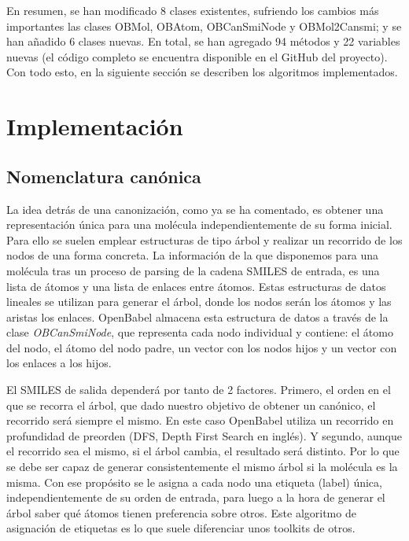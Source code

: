 En resumen, se han modificado 8 clases existentes, sufriendo los cambios más importantes las clases OBMol, OBAtom, OBCanSmiNode y OBMol2Cansmi; y se han añadido 6 clases nuevas. En total, se han agregado 94 métodos y 22 variables nuevas (el código completo se encuentra disponible en el GitHub del proyecto). Con todo esto, en la siguiente sección se describen los algoritmos implementados.

\section{Implementación}

\subsection{Nomenclatura canónica} \label{canonizacion} \label{implementacion:canonizado}

La idea detrás de una canonización, como ya se ha comentado, es obtener una representación única para una molécula independientemente de su forma inicial. Para ello se suelen emplear estructuras de tipo árbol y realizar un recorrido de los nodos de una forma concreta. La información de la que disponemos para una molécula tras un proceso de parsing de la cadena SMILES de entrada, es una lista de átomos y una lista de enlaces entre átomos. Estas estructuras de datos lineales se utilizan para generar el árbol, donde los nodos serán los átomos y las aristas los enlaces. OpenBabel almacena esta estructura de datos a través de la clase \textit{OBCanSmiNode}, que representa cada nodo individual y contiene: el átomo del nodo, el átomo del nodo padre, un vector con los nodos hijos y un vector con los enlaces a los hijos.

El SMILES de salida dependerá por tanto de 2 factores. Primero, el orden en el que se recorra el árbol, que dado nuestro objetivo de obtener un canónico, el recorrido será siempre el mismo. En este caso OpenBabel utiliza un recorrido en profundidad de preorden (DFS, Depth First Search en inglés). Y segundo, aunque el recorrido sea el mismo, si el árbol cambia, el resultado será distinto. Por lo que se debe ser capaz de generar consistentemente el mismo árbol si la molécula es la misma. Con ese propósito se le asigna a cada nodo una etiqueta (label) única, independientemente de su orden de entrada, para luego a la hora de generar el árbol saber qué átomos tienen preferencia sobre otros. Este algoritmo de asignación de etiquetas es lo que suele diferenciar unos toolkits de otros.

